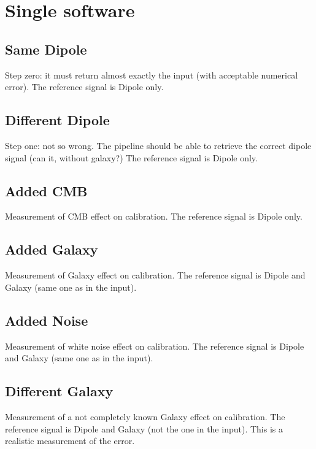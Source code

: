\section{Single software}
\label{sec:single_software}

\subsection{Same Dipole}

Step zero: it must return almost exactly the input (with acceptable numerical error).
The reference signal is Dipole only.

\subsection{Different Dipole}

Step one: not so wrong.
The pipeline should be able to retrieve the correct dipole signal (can it, without galaxy?)
The reference signal is Dipole only.

\subsection{Added CMB}

Measurement of CMB effect on calibration.
The reference signal is Dipole only.

\subsection{Added Galaxy}

Measurement of Galaxy effect on calibration.
The reference signal is Dipole and Galaxy (same one as in the input).

\subsection{Added Noise}

Measurement of white noise effect on calibration.
The reference signal is Dipole and Galaxy (same one as in the input).

\subsection{Different Galaxy}

Measurement of a not completely known Galaxy effect on calibration.
The reference signal is Dipole and Galaxy (not the one in the input).
This is a realistic measurement of the error.
